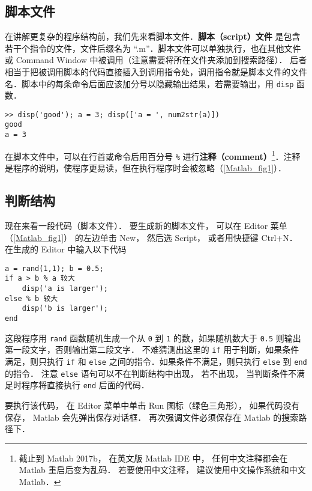 

\subsection{脚本文件}
在讲解更复杂的程序结构前，我们先来看脚本文件．\textbf{脚本（script）文件} 是包含若干个指令的文件，文件后缀名为 “.m”．脚本文件可以单独执行，也在其他文件或 Command Window 中被调用（注意需要将所在文件夹添加到搜索路径）． 后者相当于把被调用脚本的代码直接插入到调用指令处，调用指令就是脚本文件的文件名．脚本中的每条命令后面应该加分号以隐藏输出结果，若需要输出，用 \lstinline|disp| 函数．
\begin{lstlisting}[language=MatlabCom]
>> disp('good'); a = 3; disp(['a = ', num2str(a)])
good
a = 3
\end{lstlisting}
在脚本文件中，可以在行首或命令后用百分号 \lstinline|%| 进行\textbf{注释（comment）}\footnote{截止到 Matlab 2017b， 在英文版 Matlab IDE 中， 任何中文注释都会在 Matlab 重启后变为乱码． 若要使用中文注释， 建议使用中文操作系统和中文 Matlab．}．注释是程序的说明，使程序更易读，但在执行程序时会被忽略（\autoref{Matlab_fig1}）．

\subsection{判断结构}
现在来看一段代码（脚本文件）． 要生成新的脚本文件， 可以在 Editor 菜单（\autoref{Matlab_fig1}） 的左边单击 New， 然后选 Script， 或者用快捷键 Ctrl+N． 在生成的 Editor 中输入以下代码

\begin{lstlisting}[language=MyMatlab]
a = rand(1,1); b = 0.5;
if a > b % a 较大
    disp('a is larger');
else % b 较大
    disp('b is larger');
end
\end{lstlisting}

这段程序用 \lstinline|rand| 函数随机生成一个从 \lstinline|0| 到 \lstinline|1| 的数，如果随机数大于 \lstinline|0.5| 则输出第一段文字，否则输出第二段文字． 不难猜测出这里的 \lstinline|if| 用于判断，如果条件满足，则只执行 \lstinline|if| 和 \lstinline|else| 之间的指令．如果条件不满足，则只执行 \lstinline|else| 到 \lstinline|end| 的指令． 注意 \lstinline|else| 语句可以不在判断结构中出现， 若不出现， 当判断条件不满足时程序将直接执行 \lstinline|end| 后面的代码．

要执行该代码， 在 Editor 菜单中单击 Run 图标（绿色三角形）， 如果代码没有保存， Matlab 会先弹出保存对话框． 再次强调文件必须保存在 Matlab 的搜索路径下．

